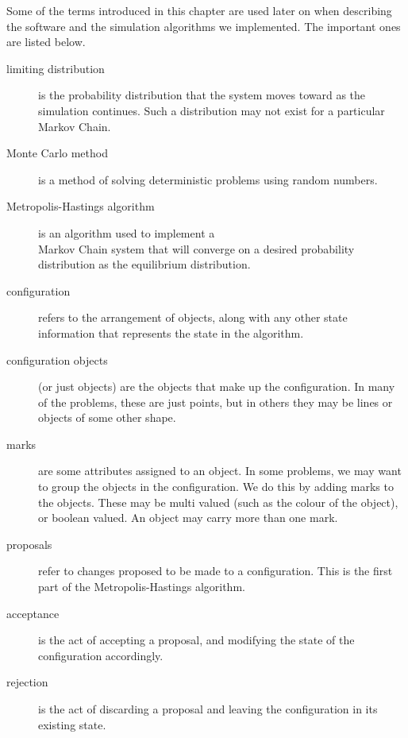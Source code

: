 Some of the terms introduced in this chapter are used later on when
describing the software and the simulation algorithms we implemented.
The important ones are listed below.

\begin{description}
\item[limiting distribution] is the probability distribution that the
system moves toward as the simulation continues.  Such a distribution
may not exist for a particular Markov Chain.
\item[Monte Carlo method] is a method of solving deterministic
problems using random numbers.
\item[Metropolis-Hastings algorithm] is an algorithm used to implement
a \\Markov Chain system that will converge on a desired probability
distribution as the equilibrium distribution.
\item[configuration] refers to the arrangement of objects, along with
any other state information that represents the state in the
algorithm.
\item[configuration objects] (or just objects) are the objects that
make up the configuration.  In many of the problems, these are just
points, but in others they may be lines or objects of some other
shape.
\item[marks] are some attributes assigned to an object.  In some
problems, we may want to group the objects in the configuration.  We
do this by adding marks to the objects.  These may be multi valued
(such as the colour of the object), or boolean valued.  An object may
carry more than one mark.
\item[proposals] refer to changes proposed to be made to a
configuration.  This is the first part of the Metropolis-Hastings
algorithm.
\item[acceptance] is the act of accepting a proposal, and modifying
the state of the configuration accordingly.
\item[rejection] is the act of discarding a proposal and leaving the
configuration in its existing state.
\end{description}



